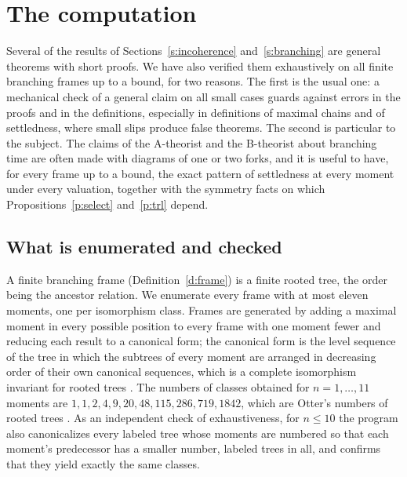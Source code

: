 \documentclass{situationist-preprint}
\begin{document}
\section{The computation}\label{s:computation}

Several of the results of Sections~\ref{s:incoherence} and~\ref{s:branching} are general theorems with short proofs. We have also verified them exhaustively on all finite branching frames up to a bound, for two reasons. The first is the usual one: a mechanical check of a general claim on all small cases guards against errors in the proofs and in the definitions, especially in definitions of maximal chains and of settledness, where small slips produce false theorems. The second is particular to the subject. The claims of the A-theorist and the B-theorist about branching time are often made with diagrams of one or two forks, and it is useful to have, for every frame up to a bound, the exact pattern of settledness at every moment under every valuation, together with the symmetry facts on which Propositions~\ref{p:select} and~\ref{p:trl} depend.

\subsection{What is enumerated and checked}

A finite branching frame (Definition~\ref{d:frame}) is a finite rooted tree, the order being the ancestor relation. We enumerate every frame with at most eleven moments, one per isomorphism class. Frames are generated by adding a maximal moment in every possible position to every frame with one moment fewer and reducing each result to a canonical form; the canonical form is the level sequence of the tree in which the subtrees of every moment are arranged in decreasing order of their own canonical sequences, which is a complete isomorphism invariant for rooted trees \citep{AhoHopcroftUllman1974,BeyerHedetniemi1980}. The numbers of classes obtained for $n = 1, \dots, 11$ moments are $1, 1, 2, 4, 9, 20, 48, 115, 286, 719, 1842$, which are Otter's numbers of rooted trees \citep{Otter1948,Cayley1857}. As an independent check of exhaustiveness, for $n \leq 10$ the program also canonicalizes every labeled tree whose moments are numbered so that each moment's predecessor has a smaller number, \NLabelled{} labeled trees in all, and confirms that they yield exactly the same classes.
\end{document}

